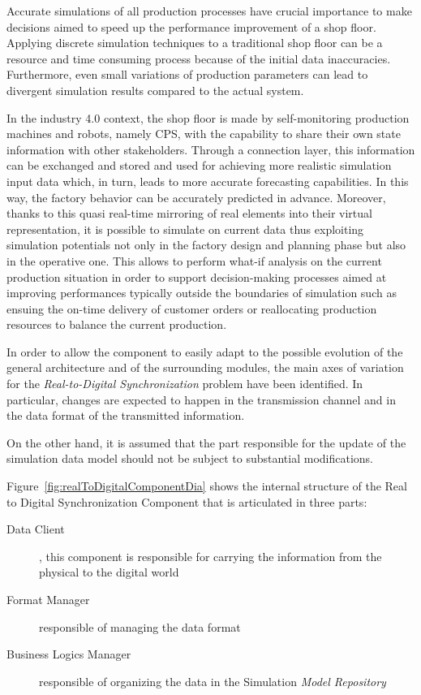 Accurate simulations of all production processes have crucial importance to make decisions aimed to speed up the performance improvement of a shop floor. 
Applying discrete simulation techniques to a traditional shop floor can be a resource and time consuming process because of the initial data inaccuracies. 
Furthermore, even small variations of production parameters can lead to divergent simulation results compared to the actual system.

In the industry 4.0 context, the shop floor is made by self-monitoring production machines and robots, namely CPS, with the capability to share their own state information with other stakeholders. Through a connection layer, this information can be exchanged and stored and used for achieving more realistic simulation input data which, in turn, leads to more accurate forecasting capabilities. In this way, the factory behavior can be accurately predicted in advance. Moreover, thanks to this quasi real-time mirroring of real elements into their virtual representation, it is possible to simulate on current data thus exploiting simulation potentials not only in the factory design and planning phase but also in the operative one. This allows to perform what-if analysis on the current production situation in order to support decision-making processes aimed at improving performances typically outside the boundaries of simulation such as ensuing the on-time delivery of customer orders or reallocating production resources to balance the current production.

In order to allow the component to easily adapt to the possible evolution of the general architecture and of the surrounding modules, the main axes of variation for the \textit{Real-to-Digital Synchronization} problem have been identified. 
In particular, changes are expected to happen in the transmission channel and in the data format of the transmitted information.

On the other hand, it is assumed that the part responsible for the update of the simulation data model should not be subject to substantial modifications.

Figure~\ref{fig:realToDigitalComponentDia} shows the internal structure of the Real to Digital Synchronization Component that is articulated in three parts:
\begin{description}
\item[Data Client], this component is responsible for carrying the information from the physical to the digital world
\item[Format Manager] responsible of managing the data format
\item[Business Logics Manager] responsible of organizing the data in the Simulation \textit{Model Repository}
\end{description}

